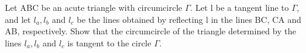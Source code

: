 \item Let ABC be an acute triangle with circumcircle $\Gamma$. Let l be a tangent line to $\Gamma$, and let $l_a,l_b$ and $l_c$ be the lines obtained by reflecting l in the lines BC, CA and AB, respectively. Show that the circumcircle of the triangle determined by the lines $l_a,l_b$ and $l_c$  is tangent to the circle $\Gamma$.
